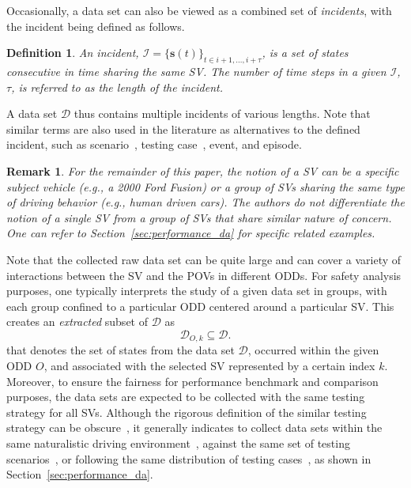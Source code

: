 \documentclass[journal]{IEEEtran}
\newtheorem{remark}{Remark}
\newtheorem{definition}{Definition}
\newcommand{\s}{\mathbf{s}}
\begin{document}
Occasionally, a data set can also be viewed as a combined set of \emph{incidents}, with the incident being defined as follows.
\begin{definition}
An incident, $\mathcal{I}=\{\s(t)\}_{t \in {i+1, \dots, i+\tau}}$, is a set of states consecutive in time sharing the same SV. The number of time steps in a given $\mathcal{I}$, $\tau$, is referred to as the \emph{length} of the incident.
\end{definition}
A data set $\mathcal{D}$ thus contains multiple incidents of various lengths. Note that similar terms are also used in the literature as alternatives to the defined incident, such as scenario~\cite{ulbrich2015defining}, testing case~\cite{thorn2018framework}, event, and episode.

\begin{remark}
For the remainder of this paper, the notion of a SV can be a specific subject vehicle (e.g., a 2000 Ford Fusion) or a group of SVs sharing the same type of driving behavior (e.g., human driven cars). The authors do not differentiate the notion of a single SV from a group of SVs that share similar nature of concern. One can refer to Section~\ref{sec:performance_da} for specific related examples.
\end{remark}

Note that the collected raw data set can be quite large and can cover a variety of interactions between the SV and the POVs in different ODDs. For safety analysis purposes, one typically interprets the study of a given data set in groups, with each group confined to a particular ODD centered around a particular SV. This creates an \emph{extracted} subset of $\mathcal{D}$ as 
\begin{equation}\label{eq:ext_data}
    \mathcal{D}_{O,k} \subseteq {\mathcal{D}}.   
\end{equation}
that denotes the set of states from the data set $\mathcal{D}$, occurred within the given ODD $O$, and associated with the selected SV represented by a certain index $k$. Moreover, to ensure the fairness for performance benchmark and comparison purposes, the data sets are expected to be collected with the same testing strategy for all SVs. Although the rigorous definition of the similar testing strategy can be obscure~\cite{weng2023comparability}, it generally indicates to collect data sets within the same naturalistic driving environment~\cite{feng2023dense}, against the same set of testing scenarios~\cite{euro2017test}, or following the same distribution of testing cases~\cite{feng2020testing}, as shown in Section~\ref{sec:performance_da}.
\end{document}
